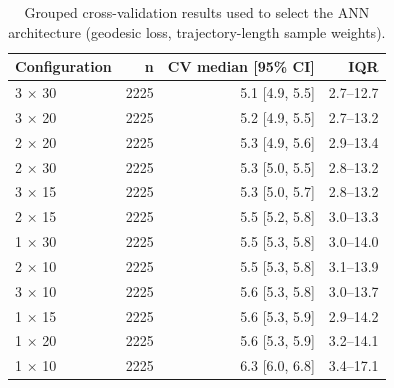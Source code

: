 \begin{table}[h!]
    \centering
    \caption{Grouped cross-validation results used to select the ANN architecture (geodesic loss, trajectory-length sample weights).}
    \label{tab:selection}
    \begin{tabular}{@{}lrrr@{}}
        \toprule
        Configuration & n & CV median [95\% CI] & IQR \\
        \midrule
        3 × 30 & 2225 & 5.1 [4.9, 5.5] & 2.7–12.7 \\
        3 × 20 & 2225 & 5.2 [4.9, 5.5] & 2.7–13.2 \\
        2 × 20 & 2225 & 5.3 [4.9, 5.6] & 2.9–13.4 \\
        2 × 30 & 2225 & 5.3 [5.0, 5.5] & 2.8–13.2 \\
        3 × 15 & 2225 & 5.3 [5.0, 5.7] & 2.8–13.2 \\
        2 × 15 & 2225 & 5.5 [5.2, 5.8] & 3.0–13.3 \\
        1 × 30 & 2225 & 5.5 [5.3, 5.8] & 3.0–14.0 \\
        2 × 10 & 2225 & 5.5 [5.3, 5.8] & 3.1–13.9 \\
        3 × 10 & 2225 & 5.6 [5.3, 5.8] & 3.0–13.7 \\
        1 × 15 & 2225 & 5.6 [5.3, 5.9] & 2.9–14.2 \\
        1 × 20 & 2225 & 5.6 [5.3, 5.9] & 3.2–14.1 \\
        1 × 10 & 2225 & 6.3 [6.0, 6.8] & 3.4–17.1 \\
        \bottomrule
    \end{tabular}
\end{table}
